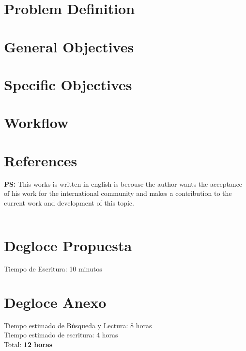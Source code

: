 \documentclass[letter, 11pt]{article}
\begin{document}


\newpage

\section{Problem Definition}

\section{General Objectives }

\section{Specific Objectives}

\section{Workflow}

\section{References}

\newpage
\textbf{PS:} This works is written in english is becouse the author wants the acceptance of his work for the international community and makes a contribution to the current work and development of this topic.\\\\
\section*{Degloce Propuesta}
\noindent
Tiempo de Escritura: 10 minutos\\ 
\section*{Degloce Anexo}
\noindent
Tiempo estimado de B\'usqueda y Lectura: 8 horas\\
Tiempo estimado de escritura: 4 horas\\
Total: \textbf{12 horas}
\end{document}
